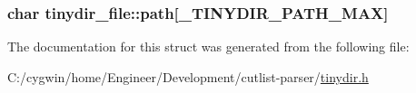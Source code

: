 \subsubsection[{path}]{\setlength{\rightskip}{0pt plus 5cm}char tinydir\+\_\+file\+::path\mbox{[}{\bf \+\_\+\+T\+I\+N\+Y\+D\+I\+R\+\_\+\+P\+A\+T\+H\+\_\+\+M\+A\+X}\mbox{]}}\label{structtinydir__file_a84d716ed154fb4af871866856af95bdb}


The documentation for this struct was generated from the following file\+:\begin{DoxyCompactItemize}
\item 
C\+:/cygwin/home/\+Engineer/\+Development/cutlist-\/parser/\hyperlink{tinydir_8h}{tinydir.\+h}\end{DoxyCompactItemize}
